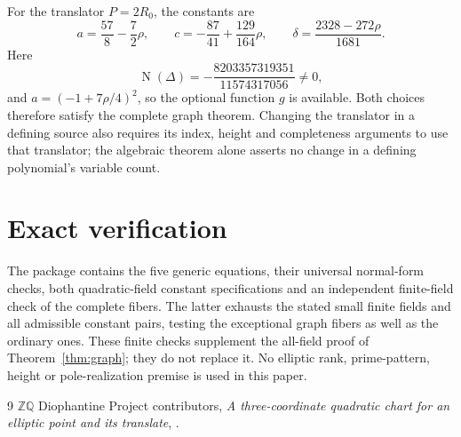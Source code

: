 \documentclass[11pt,a4paper]{article}
\DeclareMathOperator{\N}{N}
\begin{document}
For the translator $P=2R_0$, the constants are
\[
 a=\frac{57}{8}-\frac72\rho,\qquad
 c=-\frac{87}{41}+\frac{129}{164}\rho,\qquad
 \delta=\frac{2328-272\rho}{1681}.
\]
Here
\[
 \N(\Delta)=-\frac{8203357319351}{11574317056}\ne0,
\]
and $a=(-1+7\rho/4)^2$, so the optional function $g$ is available.
Both choices therefore satisfy the complete graph theorem.
Changing the translator in a defining source also requires its
index, height and completeness arguments to use that translator;
the algebraic theorem alone asserts no change in a defining
polynomial's variable count.

\section{Exact verification}
The package
contains the five generic equations, their universal normal-form
checks, both quadratic-field constant specifications and an independent
finite-field check of the complete fibers. The latter exhausts the
stated small finite fields and all admissible constant pairs, testing
the exceptional graph fibers as well as the ordinary ones.
These finite checks supplement the all-field proof of
Theorem~\ref{thm:graph}; they do not replace it. No elliptic rank,
prime-pattern, height or pole-realization premise is used in this paper.

\begin{thebibliography}{9}
$\mathbb Z\mathbb Q$ Diophantine Project contributors,
\emph{A three-coordinate quadratic chart for an elliptic point and its translate},
.
\end{thebibliography}
\end{document}
